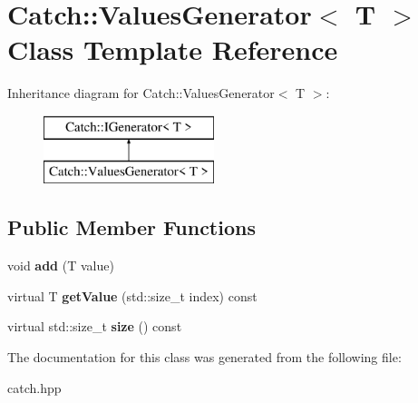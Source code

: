 \hypertarget{classCatch_1_1ValuesGenerator}{}\section{Catch\+:\+:Values\+Generator$<$ T $>$ Class Template Reference}
\label{classCatch_1_1ValuesGenerator}
Inheritance diagram for Catch\+:\+:Values\+Generator$<$ T $>$\+:\begin{figure}[H]
\begin{center}
\leavevmode
\includegraphics[height=2.000000cm]{classCatch_1_1ValuesGenerator}
\end{center}
\end{figure}
\subsection*{Public Member Functions}
\begin{DoxyCompactItemize}
\item 
void {\bfseries add} (T value)\hypertarget{classCatch_1_1ValuesGenerator_a8412c8ce5d9d4fc6ff06d5246d56d538}{}\label{classCatch_1_1ValuesGenerator_a8412c8ce5d9d4fc6ff06d5246d56d538}

\item 
virtual T {\bfseries get\+Value} (std\+::size\+\_\+t index) const \hypertarget{classCatch_1_1ValuesGenerator_a60599dd67096ff108471f64ee42acd9d}{}\label{classCatch_1_1ValuesGenerator_a60599dd67096ff108471f64ee42acd9d}

\item 
virtual std\+::size\+\_\+t {\bfseries size} () const \hypertarget{classCatch_1_1ValuesGenerator_a98a80bb0dd682c44e82e4a75e98c4682}{}\label{classCatch_1_1ValuesGenerator_a98a80bb0dd682c44e82e4a75e98c4682}

\end{DoxyCompactItemize}


The documentation for this class was generated from the following file\+:\begin{DoxyCompactItemize}
\item 
catch.\+hpp\end{DoxyCompactItemize}
